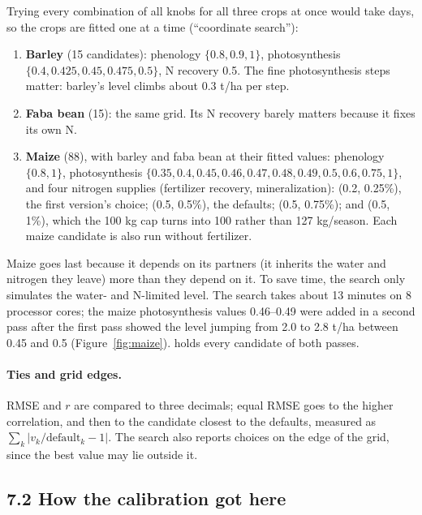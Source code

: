 \documentclass[11pt,a4paper]{article}
\newcommand{\code}[1]{\texttt{\detokenize{#1}}}
\begin{document}
Trying every combination of all knobs for all three crops at once would take days, so the crops are fitted one at
a time (``coordinate search''):
\begin{enumerate}[nosep]
  \item \textbf{Barley} (15 candidates): phenology \(\{0.8, 0.9, 1\}\), photosynthesis
        \(\{0.4, 0.425, 0.45, 0.475, 0.5\}\), N recovery 0.5. The fine photosynthesis steps matter: barley's level
        climbs about 0.3 t/ha per step.
  \item \textbf{Faba bean} (15): the same grid. Its N recovery barely matters because it fixes its own N.
  \item \textbf{Maize} (88), with barley and faba bean at their fitted values: phenology \(\{0.8, 1\}\), photosynthesis
        \(\{0.35, 0.4, 0.45, 0.46, 0.47, 0.48, 0.49, 0.5, 0.6, 0.75, 1\}\), and four nitrogen supplies (fertilizer
        recovery, mineralization): (0.2, 0.25\%), the first version's choice; (0.5, 0.5\%), the defaults;
        (0.5, 0.75\%); and (0.5, 1\%), which the 100 kg cap turns into 100 rather than 127 kg/season. Each maize
        candidate is also run without fertilizer.
\end{enumerate}
Maize goes last because it depends on its partners (it inherits the water and nitrogen they leave) more than they
depend on it. To save time, the search only simulates the water- and N-limited level. The search takes about
13 minutes on 8 processor cores; the maize photosynthesis values 0.46--0.49 were added in a second pass after the
first pass showed the level jumping from 2.0 to 2.8 t/ha between 0.45 and 0.5 (Figure~\ref{fig:maize}).
\code{fit_history.csv} holds every candidate of both passes.

\paragraph{Ties and grid edges.} RMSE and \(r\) are compared to three decimals; equal RMSE goes to the higher
correlation, and then to the candidate closest to the defaults, measured as \(\sum_k |v_k/\text{default}_k - 1|\). The
search also reports choices on the edge of the grid, since the best value may lie outside it.

\subsection*{7.2 How the calibration got here}
\end{document}
